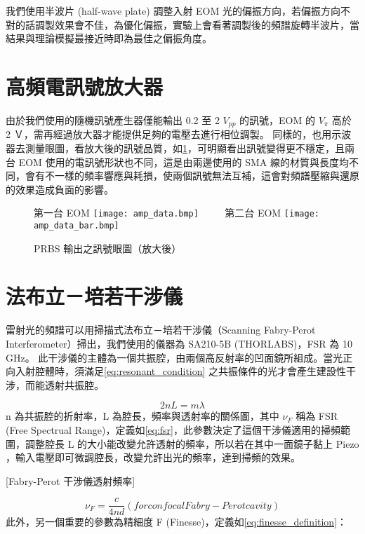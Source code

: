 \documentclass[class=NCU_thesis, crop=false]{standalone}
\begin{document}
我們使用半波片 (half-wave plate) 調整入射 EOM 光的偏振方向，若偏振方向不對的話調製效果會不佳，為優化偏振，實驗上會看著調製後的頻譜旋轉半波片，當結果與理論模擬最接近時即為最佳之偏振角度。

\section{高頻電訊號放大器}
由於我們使用的隨機訊號產生器僅能輸出 0.2 至 2 $V_{pp}$ 的訊號，EOM 的 $V_{\pi}$ 高於 2 Ｖ，需再經過放大器才能提供足夠的電壓去進行相位調製。
同樣的，也用示波器去測量眼圖，看放大後的訊號品質，如\cref{fig:amp_prbs_eye}，可明顯看出訊號變得更不穩定，且兩台 EOM 使用的電訊號形狀也不同，這是由兩邊使用的 SMA 線的材質與長度均不同，會有不一樣的頻率響應與耗損，使兩個訊號無法互補，這會對頻譜壓縮與還原的效果造成負面的影響。

\begin{figure}[!hbt]
    \centering
    \subcaptionbox
        {第一台 EOM
        \label{fig:subfig_fig1}}
        {\texttt{[image: amp\_data.bmp]}}
    ~~~~
    \subcaptionbox
        {第二台 EOM
        \label{fig:subfig_fig2}}
        {\texttt{[image: amp\_data\_bar.bmp]}}
    \caption{PRBS 輸出之訊號眼圖（放大後）}
    \label{fig:amp_prbs_eye}
\end{figure}

\section{法布立－培若干涉儀}
雷射光的頻譜可以用掃描式法布立－培若干涉儀（Scanning Fabry-Perot Interferometer）掃出，我們使用的儀器為 SA210-5B (THORLABS)，FSR 為 10 GHz。
此干涉儀的主體為一個共振腔，由兩個高反射率的凹面鏡所組成。當光正向入射腔體時，須滿足\cref{eq:resonant_condition} 之共振條件的光才會產生建設性干涉，而能透射共振腔。

\begin{equation}
    2nL=m\lambda
    \label{eq:resonant_condition}
\end{equation}
n 為共振腔的折射率，L 為腔長，頻率與透射率的關係圖，其中 $\nu_{F}$ 稱為 FSR (Free Spectrual Range)，定義如\cref{eq:fsr}，此參數決定了這個干涉儀適用的掃頻範圍，調整腔長 L 的大小能改變允許透射的頻率，所以若在其中一面鏡子黏上 Piezo ，輸入電壓即可微調腔長，改變允許出光的頻率，達到掃頻的效果。

[Fabry-Perot 干涉儀透射頻率]

\begin{equation}
    \nu_{F}=\frac{c}{4nd}(for confocal Fabry-Perot cavity)
    \label{eq:fsr}
\end{equation}
此外，另一個重要的參數為精細度 F (Finesse)，定義如\cref{eq:finesse_definition}：
\end{document}
